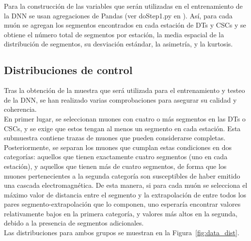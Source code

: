 Para la construcci\'on de las variables que ser\'an utilizadas en el entrenamiento de la DNN se usan agregaciones de Pandas (ver doStep1.py en \cite{processor}). As\'i, para cada mu\'on se agregan los segmentos encontrados en cada estaci\'on de DTs y CSCs y se obtiene el n\'umero total de segmentos por estaci\'on, la media espacial de la distribuci\'on de segmentos, su desviaci\'on est\'andar, la asimetr\'ia, y la kurtosis.



\subsection{Distribuciones de control}\label{sec:plots}

Tras la obtenci\'on de la muestra que ser\'a utilizada para el entrenamiento y testeo de la DNN, se han realizado varias comprobaciones para asegurar su calidad y coherencia. \\

En primer lugar, se seleccionan muones con cuatro o m\'as segmentos en las DTs o CSCs, y se exige que estos tengan al menos un segmento en cada estaci\'on. Esta submuestra contiene trazas de muones que pueden considerarse completas. \\
Posteriormente, se separan los muones que cumplan estas condiciones en dos categor\'ias: aquellos que tienen exactamente cuatro segmentos (uno en cada estaci\'on), y aquellos que tienen m\'as de cuatro segmentos, de forma que los muones pertenecientes a la segunda categor\'ia son susceptibles de haber emitido una cascada electromagn\'etica. De esta manera, si para cada mu\'on se selecciona el m\'aximo valor de distancia entre el segmento y la extrapolaci\'on de entre todos los pares segmento-extrapolaci\'on que lo componen, uno esperar\'ia encontrar valores relativamente bajos en la primera categor\'ia, y valores m\'as altos en la segunda, debido a la presencia de segmentos adicionales. \\
Las distribuciones para ambos grupos se muestran en la Figura~\ref{fig:data_dist}. \\


